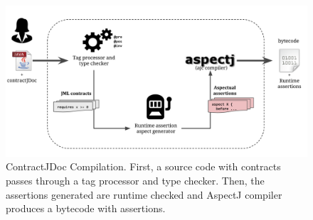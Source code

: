 \begin{figure}[h]
\centering
\includegraphics[width=1.0\textwidth]{figs/compilerInfra}
\caption{ContractJDoc Compilation. First, a source code with \contractjdoc{}
contracts passes through a tag processor and type checker. Then, the assertions
generated are runtime checked and AspectJ compiler produces a bytecode with
assertions.}
\label{fig:compilerInfra}
\end{figure}

